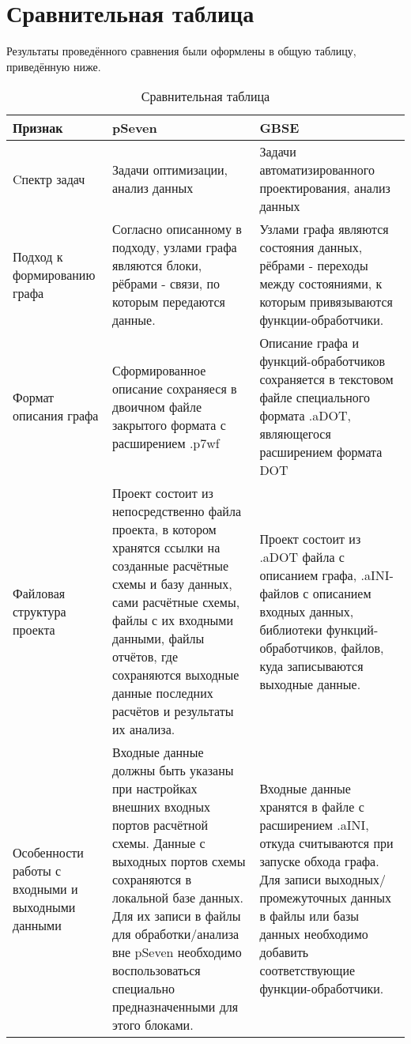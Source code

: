 \section{Сравнительная таблица}
Результаты проведённого сравнения были оформлены в общую таблицу, приведённую ниже.
\noindent\begin{longtable}{|p{3.5cm}|p{6.5cm}|p{6.5cm}|}
    \caption{Сравнительная таблица \label{thetable}} \\
    \hline
    \textbf{Признак} & \textbf{pSeven} & \textbf{GBSE} \\
    \hline
    Cпектр задач & Задачи оптимизации, анализ данных & Задачи автоматизированного проектирования, анализ данных \\
    \hline
    Подход к формированию графа & Согласно описанному в \cite{Nazarenko2015} подходу, узлами графа являются блоки, рёбрами - связи, по которым передаются данные. & Узлами графа являются состояния данных, рёбрами - переходы между состояниями, к которым привязываются функции-обработчики. \cite{SokolovPershin2018} \\
    \hline
    Формат описания графа & Сформированное описание сохраняеся в двоичном файле закрытого формата с расширением \textsf{.p7wf} & Описание графа и функций-обработчиков сохраняется в текстовом файле специального формата \textsf{.aDOT}, являющегося расширением формата DOT\cite{SokolovPershin2018} \\
    \hline
    Файловая структура проекта & Проект состоит из непосредственно файла проекта, в котором хранятся ссылки на созданные расчётные схемы и базу данных, сами расчётные схемы, файлы с их входными данными, файлы отчётов, где сохраняются выходные данные последних расчётов и результаты их анализа. & Проект состоит из \textsf{.aDOT} файла с описанием графа, \textsf{.aINI}-файлов с описанием входных данных, библиотеки функций-обработчиков, файлов, куда записываются выходные данные. \\
    \hline
    Особенности работы с входными и выходными данными & Входные данные должны быть указаны при настройках внешних входных портов расчётной схемы. Данные с выходных портов схемы сохраняются в локальной базе данных. Для их записи в файлы для обработки/анализа вне pSeven необходимо воспользоваться специально предназначенными для этого блоками. & Входные данные хранятся в файле с расширением .aINI, откуда считываются при запуске обхода графа\cite{SokolovPershin2017}. Для записи выходных/промежуточных данных в файлы или базы данных необходимо добавить соответствующие функции-обработчики. \\

\end{longtable}
